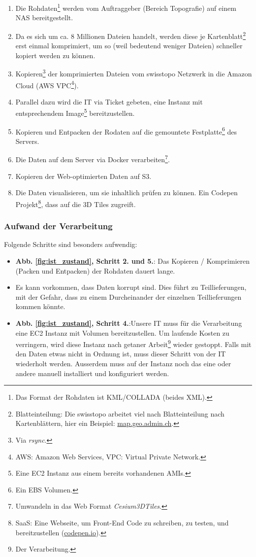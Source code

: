 \begin{enumerate}
\item Die Rohdaten\footnote{Das Format der Rohdaten ist KML/COLLADA (beides XML).} werden vom Auftraggeber (Bereich Topografie) auf einem NAS bereitgestellt.
\item Da es sich um ca. 8 Millionen Dateien handelt, werden diese je Kartenblatt\footnote{Blatteinteilung: Die swisstopo arbeitet viel nach Blatteinteilung nach Kartenblättern, hier ein Beispiel: \href{https://s.geo.admin.ch/8b5f3f6721}{map.geo.admin.ch}.} erst einmal komprimiert, um so (weil bedeutend weniger Dateien) schneller kopiert werden zu können.
\item Kopieren\footnote{Via \emph{rsync}.} der komprimierten Dateien vom swisstopo Netzwerk in die Amazon Cloud (AWS VPC\footnote{AWS: Amazon Web Services, VPC: Virtual Private Network.}).
\item Parallel dazu wird die IT via Ticket gebeten, eine Instanz mit entsprechendem Image\footnote{Eine EC2 Instanz aus einem bereits vorhandenen AMIs.} bereitzustellen.
\item Kopieren und Entpacken der Rodaten auf die gemountete Festplatte\footnote{Ein EBS Volumen.} des Servers.
\item Die Daten auf dem Server via Docker verarbeiten\footnote{Umwandeln in das Web Format \emph{Cesium3DTiles}.}.
\item Kopieren der Web-optimierten Daten auf S3.
\item Die Daten visualisieren, um sie inhaltlich prüfen zu können. Ein Codepen Projekt\footnote{SaaS: Eine Webseite, um Front-End Code zu schreiben, zu testen, und bereitzustellen (\href{https://codepen.io}{codepen.io}).}, dass auf die 3D Tiles zugreift.
\end{enumerate}

\subsubsection{Aufwand der Verarbeitung}
\label{aufwand_prozessierung}
Folgende Schritte sind besonders aufwendig:
\begin{itemize}
\item \textbf{Abb. \ref{fig:ist_zustand}, Schritt 2. und 5.}: Das Kopieren / Komprimieren (Packen und Entpacken) der Rohdaten dauert lange.
\item Es kann vorkommen, dass Daten korrupt sind. Dies führt zu Teillieferungen, mit der Gefahr, dass zu einem Durcheinander der einzelnen Teillieferungen kommen könnte.
\item \textbf{Abb. \ref{fig:ist_zustand}, Schritt 4.}:Unsere IT muss für die Verarbeitung eine EC2 Instanz mit Volumen bereitzustellen. Um laufende Kosten zu verringern, wird diese Instanz nach getaner Arbeit\footnote{Der Verarbeitung.} wieder gestoppt. Falls mit den Daten etwas nicht in Ordnung ist, muss dieser Schritt von der IT wiederholt werden. Ausserdem muss auf der Instanz noch das eine oder andere manuell installiert und konfiguriert werden.
\end{itemize}

